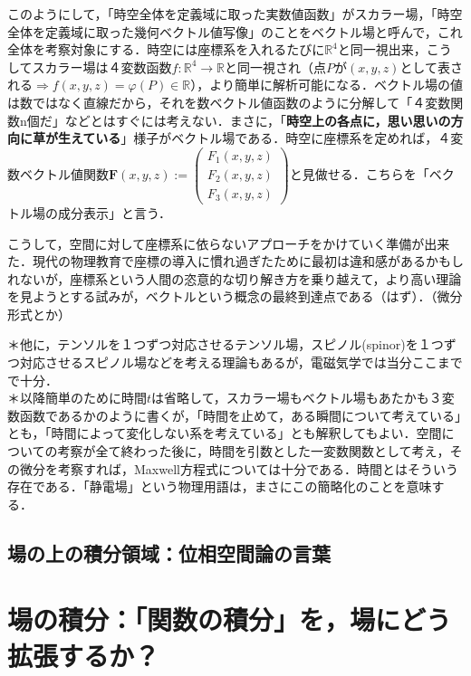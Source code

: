 \documentclass[uplatex, 12pt, a4paper]{jsarticle}
\begin{document}
このようにして，「時空全体を定義域に取った実数値函数」がスカラー場，「時空全体を定義域に取った幾何ベクトル値写像」のことをベクトル場と呼んで，これ全体を考察対象にする．時空には座標系を入れるたびに$\mathbb{R}^4$と同一視出来，こうしてスカラー場は４変数函数$f:\mathbb{R}^4\longrightarrow \mathbb{R}$と同一視され（点$P$が$(x,y,z)$として表される$\Longrightarrow f(x,y,z)=\varphi(P) \in \mathbb{R}$），より簡単に解析可能になる．ベクトル場の値は数ではなく直線だから，それを数ベクトル値函数のように分解して「４変数関数n個だ」などとはすぐには考えない．まさに，「\textbf{時空上の各点に，思い思いの方向に草が生えている}」様子がベクトル場である．時空に座標系を定めれば，４変数ベクトル値関数$\mathbf{F}(x,y,z) := \left( \begin{array}{c} F_1(x,y,z) \\ F_2(x,y,z) \\ F_3(x,y,z) \end{array} \right)$と見做せる．こちらを「ベクトル場の成分表示」と言う．

こうして，空間に対して座標系に依らないアプローチをかけていく準備が出来た．現代の物理教育で座標の導入に慣れ過ぎたために最初は違和感があるかもしれないが，座標系という人間の恣意的な切り解き方を乗り越えて，より高い理論を見ようとする試みが，ベクトルという概念の最終到達点である（はず）．（微分形式とか）

\noindent
＊他に，テンソルを１つずつ対応させるテンソル場，スピノル(spinor)を１つずつ対応させるスピノル場などを考える理論もあるが，電磁気学では当分ここまでで十分．\\
＊以降簡単のために時間$t$は省略して，スカラー場もベクトル場もあたかも３変数函数であるかのように書くが，「時間を止めて，ある瞬間について考えている」とも，「時間によって変化しない系を考えている」とも解釈してもよい．空間についての考察が全て終わった後に，時間を引数とした一変数関数として考え，その微分を考察すれば，Maxwell方程式については十分である．時間とはそういう存在である．「静電場」という物理用語は，まさにこの簡略化のことを意味する．

\subsection{場の上の積分領域：位相空間論の言葉}

\section{場の積分：「関数の積分」を，場にどう拡張するか？}
\end{document}
